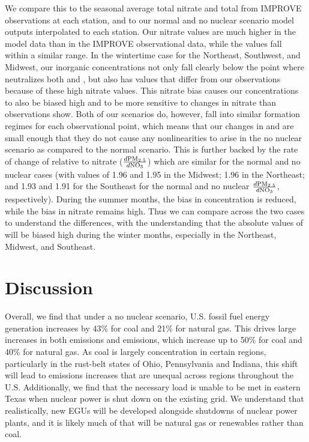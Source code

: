 \documentclass[12]{article}
\begin{document}
We compare this to the seasonal average total nitrate and total  from IMPROVE observations at each station, and to our normal and no nuclear scenario model outputs interpolated to each station. Our nitrate values are much higher in the model data than in the IMPROVE observational data, while the  values fall within a similar range. In the wintertime case for the Northeast, Southwest, and Midwest, our inorganic  concentrations not only fall clearly below the point where  neutralizes both  and , but also has values that differ from our observations because of these high nitrate values. This nitrate bias causes our  concentrations to also be biased high and to be more sensitive to changes in nitrate than observations show. Both of our scenarios do, however, fall into similar  formation regimes for each observational point, which means that our changes in  and  are small enough that they do not cause any nonlinearities to arise in the no nuclear scenario as compared to the normal scenario. This is further backed by the rate of change of  relative to nitrate ($\frac{d\ce{PM_{2.5}}}{d\ce{NO_3}}$) which are similar for the normal and no nuclear cases (with values of 1.96 and 1.95 in the Midwest; 1.96 in the Northeast; and 1.93 and 1.91 for the Southeast for the normal and no nuclear $\frac{d\ce{PM_{2.5}}}{d\ce{NO_3}}$, respectively). During the summer months, the bias in  concentration is reduced, while the bias in nitrate remains high. Thus we can compare across the two cases to understand the differences, with the understanding that the absolute values of  will be biased high during the winter months, especially in the Northeast, Midwest, and Southeast.


\section{Discussion}

Overall, we find that under a no nuclear scenario, U.S. fossil fuel energy generation increases by 43\% for coal and 21\% for natural gas. This drives large increases in both  emissions and  emissions, which increase up to 50\% for coal and 40\% for natural gas. As coal is largely concentration in certain regions, particularly in the rust-belt states of Ohio, Pennsylvania and Indiana, this shift will lead to emissions increases that are unequal across regions throughout the U.S. Additionally, we find that the necessary load is unable to be met in eastern Texas when nuclear power is shut down on the existing grid. We understand that realistically, new EGUs will be developed alongside shutdowns of nuclear power plants, and it is likely much of that will be natural gas or renewables rather than coal.
\end{document}
